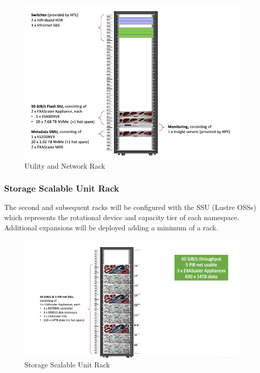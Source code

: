 \documentclass{article}
\begin{document}
\begin{figure}[h]
    \centering
    \includegraphics[scale=0.35]{utility-rack.png}
    \caption{Utility and Network Rack}
    \label{fig:util-rack}
\end{figure}

\subsubsection{Storage Scalable Unit Rack}
The second and subsequent racks will be configured with the SSU (Lustre OSSs) which represents the rotational device and capacity tier of each namespace. Additional expansions will be deployed adding a minimum of a rack. 

\begin{figure}[h]
    \centering
    \includegraphics[scale=0.35]{SSU-rack.png}
    \caption{Storage Scalable Unit Rack}
    \label{fig:SSU-rack}
\end{figure}
\end{document}
